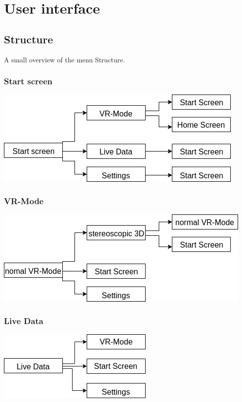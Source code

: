 \section{User interface}

\subsection{Structure}

A small overview of the menu Structure.

\subsubsection{Start screen}

\includegraphics[scale=0.5]{pics/startscreen.jpg}

\subsubsection{VR-Mode}

\includegraphics[scale=0.5]{pics/Vr-Mode.jpg}


\subsubsection{Live Data}

\includegraphics[scale=0.5]{pics/Live_Data.jpg}

